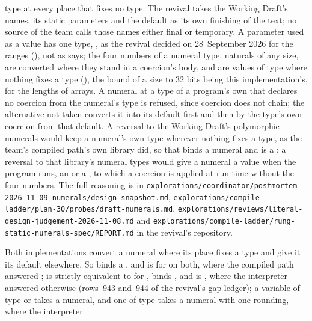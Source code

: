 \begin{description}
type at every place that fixes no type.
The revival takes the Working Draft's names, its static parameters and the
default as its own finishing of the text; no source of the team calls those
names either final or temporary.
A  parameter used as a value has one type, , as the
revival decided on 28~September 2026 for the ranges (),
not  as  says; the four numbers of a numeral
type, naturals of any size, are converted where they stand in a coercion's
body, and are values of type  where nothing fixes a type
(), the bound of a size to 32 bits being this
implementation's, for the lengths of arrays.
A numeral at a type of a program's own that declares no coercion from the
numeral's type is refused, since coercion does not chain; the alternative not
taken converts it into its default first and then by the type's own coercion
from that default.
A reversal to the Working Draft's polymorphic numerals would keep a numeral's
own type wherever nothing fixes a type, as the team's compiled path's own library
did, so that  binds a numeral and  is a
;
a reversal to that library's numeral types would give a numeral a value when the
program runs, an  or a , to which a coercion is
applied at run time without the four numbers.
The full reasoning is in
\nolinkurl{explorations/coordinator/postmortem-2026-11-09-numerals/design-snapshot.md},
\nolinkurl{explorations/compile-ladder/plan-30/probes/draft-numerals.md},
\nolinkurl{explorations/reviews/literal-design-judgement-2026-11-08.md} and
\nolinkurl{explorations/compile-ladder/rung-static-numerals-spec/REPORT.md} in
the revival's repository.
\item[Effect] Both implementations convert a numeral where its place fixes a
type and give it its default elsewhere.
So  binds a , and  is 
for  on both, where the compiled path answered
;  is strictly equivalent to
 for , 
binds , and
 is , where the interpreter answered otherwise
(rows~943 and~944 of the revival's gap ledger); a variable of type
 or  takes a numeral, and one of type
 takes a numeral with one rounding, where the interpreter

\end{description}
